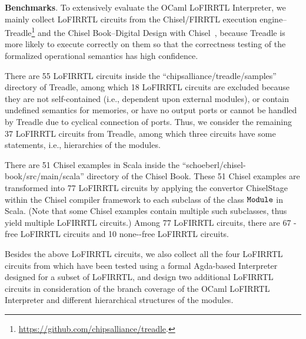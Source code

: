 
\smallskip\noindent
{\bf Benchmarks}. To extensively evaluate the OCaml LoFIRRTL Interpreter,
we mainly collect LoFIRRTL circuits from the Chisel/FIRRTL execution engine--Treadle\footnote{\url{https://github.com/chipsalliance/treadle}.} and the Chisel Book--Digital Design with Chisel~\cite{chisel:book},
because Treadle is more likely to execute correctly on them so that
the correctness testing of the formalized operational semantics has high confidence.

There are 55 LoFIRRTL circuits inside the ``chipsalliance/treadle/samples'' directory
of Treadle, among which 18 LoFIRRTL circuits are excluded because they are not self-contained (i.e., dependent upon external modules),
or contain undefined semantics for memories, or have no output ports or cannot be handled by Treadle due to cyclical connection of ports.
Thus, we consider the remaining 37 LoFIRRTL circuits from Treadle, among which three circuits have some  statements,
i.e., hierarchies of the modules.

There are 51 Chisel examples in Scala inside the ``schoeberl/chisel-book/src/main/scala'' directory of the Chisel Book.
These 51 Chisel examples are transformed into 77 LoFIRRTL circuits by applying the convertor \textsf{ChiselStage} within the Chisel compiler framework
to each subclass of the class $\tt Module$ in Scala. (Note that some Chisel examples contain multiple such subclasses, thus yield multiple LoFIRRTL circuits.)
Among 77 LoFIRRTL circuits, there are 67 -free LoFIRRTL circuits and 10 none--free LoFIRRTL circuits.

Besides the above LoFIRRTL circuits, we also collect all the four LoFIRRTL circuits from
\cite{HarrisonHA21} which have been tested using a formal Agda-based Interpreter designed for a subset of LoFIRRTL,
and design two additional LoFIRRTL circuits in consideration of the branch coverage of the OCaml LoFIRRTL  Interpreter and different hierarchical structures of the modules.

